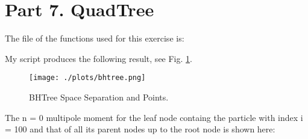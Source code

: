\section{Part 7. QuadTree}

The file of the functions used for this exercise is:



My script produces the following result, see Fig. \ref{fig:bhtree}.

\begin{figure}[h!]
  \centering
  \texttt{[image: ./plots/bhtree.png]}
  \caption{BHTree Space Separation and Points.}
  \label{fig:bhtree}
\end{figure}

The n = 0 multipole moment for the leaf node containg the particle with index i = 100 and that of
all its parent nodes up to the root node is shown here:


